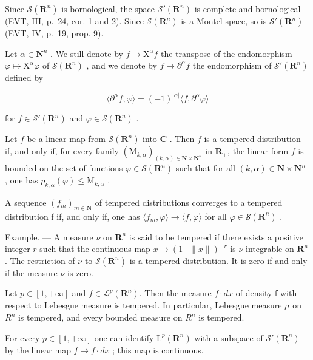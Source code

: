 Since \(\mathcal{S}(\mathbf{R}^n)\) is bornological, the space \(\mathcal{S}'(\mathbf{R}^n)\) is complete and bornological (EVT, III, p.~24, cor. 1 and 2). Since \(\mathcal{S}(\mathbf{R}^n)\) is a Montel space, so is \(\mathcal{S}'(\mathbf{R}^n)\) (EVT, IV, p.~19, prop. 9).

Let \(\alpha\in\mathbf{N}^{n}\) . We still denote by \(f\mapsto\mathrm{X}^{\alpha}f\) the transpose of the endomorphism \(\varphi\mapsto\mathrm{X}^{\alpha}\varphi\) of \(\mathcal{S}(\mathbf{R}^{n})\) , and we denote by \(f\mapsto\partial^{\alpha}f\) the endomorphism of \(\mathcal{S}'(\mathbf{R}^{n})\) defined by

\[
\langle \partial^ {\alpha} f, \varphi \rangle = (- 1) ^ {| \alpha |} \langle f, \partial^ {\alpha} \varphi \rangle
\]

for \(f\in \mathcal{S}'(\mathbf{R}^n)\) and \(\varphi \in \mathcal{S}(\mathbf{R}^n)\) .

Let \(f\) be a linear map from \(\mathcal{S}(\mathbf{R}^{n})\) into \(\mathbf{C}\) . Then \(f\) is a tempered distribution if, and only if, for every family \((\mathrm{M}_{k,\alpha})_{(k,\alpha)\in\mathbf{N}\times\mathbf{N}^{n}}\) in \(\mathbf{R}_{+}\), the linear form \(f\) is bounded on the set of functions \(\varphi\in\mathcal{S}(\mathbf{R}^{n})\) such that for all \((k,\alpha)\in\mathbf{N}\times\mathbf{N}^{n}\) , one has \(p_{k,\alpha}(\varphi)\leqslant\mathrm{M}_{k,\alpha}\) .

A sequence \((f_{m})_{m\in\mathbf{N}}\) of tempered distributions converges to a tempered distribution f if, and only if, one has \(\langle f_{m},\varphi\rangle\to\langle f,\varphi\rangle\) for all \(\varphi\in\mathcal{S}(\mathbf{R}^{n})\) .

Example. --- A measure \(\nu\) on \(\mathbf{R}^n\) is said to be tempered if there exists a positive integer \(r\) such that the continuous map \(x \mapsto (1 + \|x\|)^{-r}\) is \(\nu\)-integrable on \(\mathbf{R}^n\). The restriction of \(\nu\) to \(\mathcal{S}(\mathbf{R}^n)\) is a tempered distribution. It is zero if and only if the measure \(\nu\) is zero.

Let \(p \in [1, +\infty]\) and \(f \in \mathcal{L}^{p}(\mathbf{R}^{n})\). Then the measure \(f \cdot dx\) of density f with respect to Lebesgue measure is tempered. In particular, Lebesgue measure \(\mu\) on \(R^{n}\) is tempered, and every bounded measure on \(R^{n}\) is tempered.

For every \(p \in [1, +\infty]\) one can identify \(\mathrm{L}^{p}(\mathbf{R}^{n})\) with a subspace of \(\mathcal{S}'(\mathbf{R}^{n})\) by the linear map \(f \mapsto f \cdot dx\) ; this map is continuous.


